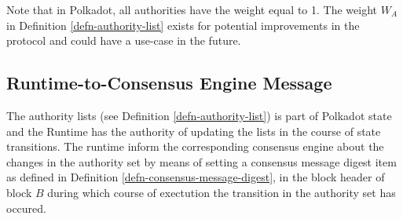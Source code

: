 \documentclass{book}
\begin{document}
Note that in Polkadot, all authorities have the weight equal to 1. The weight
$W_A$ in Definition \ref{defn-authority-list} exists for potential
improvements in the protocol and could have a use-case in the future.

\subsection{Runtime-to-Consensus Engine
Message}\label{sect-consensus-message-digest}

The authority lists (see Definition \ref{defn-authority-list}) is part of
Polkadot state and the Runtime has the authority of updating the lists in the
course of state transitions. The runtime inform the corresponding consensus
engine about the changes in the authority set by means of setting a consensus
message digest item as defined in Definition
\ref{defn-consensus-message-digest}, in the block header of block $B$ during
which course of exectution the transition in the authority set has occured.
\end{document}
